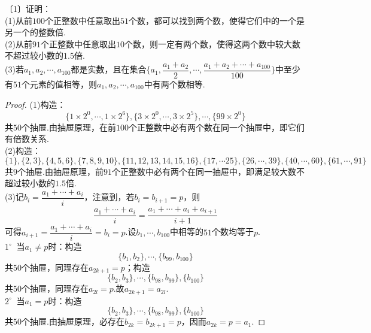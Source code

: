 \documentclass[lang=cn, zihao=4.5]{elegantbook}
\newcommand{\nd}[1]{〔#1〕}
\newcommand{\buzhou}[1]{$#1^{\circ} \ $}
\begin{document}
\begin{example} %
	\nd{1}证明： \\
	(1)从前$100$个正整数中任意取出$51$个数，都可以找到两个数，使得它们中的一个是另一个的整数倍. \\
	(2)从前$91$个正整数中任意取出$10$个数，则一定有两个数，使得这两个数中较大数不超过较小数的$1.5$倍. \\
	(3)若$a_1,a_2,\cdots ,a_{100}$都是实数，且在集合$\{ a_1, \dfrac{a_1+a_2}{2}, \cdots ,\dfrac{a_1+a_2+\cdots +a_{100}}{100} \}$中至少有$51$个元素的值相等，则$a_1,a_2, \cdots ,a_{100}$中有两个数相等.
\end{example}
\begin{proof}
	(1)构造：$$\{ 1 \times 2^0, \cdots , 1 \times 2^6 \},\{ 3 \times 2^0, \cdots , 3 \times 2^5 \}, \cdots ,\{99 \times 2^0 \}$$共$50$个抽屉.由抽屉原理，在前$100$个正整数中必有两个数在同一个抽屉中，即它们有倍数关系. \\
	(2)构造：$$\{ 1 \},\{ 2,3 \},\{ 4,5,6 \},\{ 7,8,9,10 \},\{ 11,12,13,14,15,16 \},\{ 17,\cdots 25 \},\{ 26,\cdots ,39 \},\{ 40, \cdots ,60 \},\{ 61, \cdots ,91 \}$$共$9$个抽屉.由抽屉原理，前$91$个正整数中必有两个在同一抽屉中，即满足较大数不超过较小数的$1.5$倍. \\
	(3)记$b_i=\dfrac{a_1+ \cdots + a_i}{i}$，注意到，若$b_i=b_{i+1}=p$，则$$\frac{a_1+ \cdots + a_i}{i} = \frac{a_1+ \cdots + a_i + a_{i+1}}{i+1}$$可得$a_{i+1} = \dfrac{a_1 + \cdots + a_i}{i} = b_i = p$.设$b_1, \cdots ,b_{100}$中相等的$51$个数均等于$p$. \\
	\buzhou{1} 当$a_1 \neq p$时：构造$$\{ b_1,b_2 \}, \cdots ,\{ b_{99},b_{100} \}$$共$50$个抽屉，同理存在$a_{2k+1}=p$；构造$$\{ b_2,b_3 \}, \cdots ,\{ b_{98},b_{99} \},\{ b_{100} \}$$共$50$个抽屉，同理存在$a_{2l}=p$.故$a_{2k+1}=a_{2l}$. \\
	\buzhou{2} 当$a_1=p$时：构造$$\{ b_2,b_3 \}, \cdots ,\{ b_{98},b_{99} \},\{ b_{100} \}$$共$50$个抽屉.由抽屉原理，必存在$b_{2k}=b_{2k+1}=p$，因而$a_{2k}=p=a_1$.
\end{proof}
\end{document}
